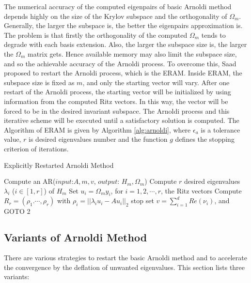{The numerical accuracy of the computed eigenpairs of basic Arnoldi method depends highly on the size of the Krylov subspace and the orthogonality of $\Omega_m$. Generally, the larger the subspace is, the better the eigenpairs approximation is. The problem is that firstly the orthogonality of the computed $\Omega_m$ tends to degrade with each basis extension. Also, the larger the subspace size is, the larger the $\Omega_m$ matrix gets. Hence available memory may also limit the subspace size, and so the achievable accuracy of the Arnoldi process. To overcome this, Saad \cite{saad2011numerical} proposed to restart the Arnoldi process, which is the ERAM. Inside ERAM, the subspace size is fixed as $m$, and only the starting vector will vary. After one restart of the Arnoldi process, the starting vector will be initialized by using information from the computed Ritz vectors. In this way, the vector will be forced to be in the desired invariant subspace. The Arnoldi process and this iterative scheme will be executed until a satisfactory solution is computed. The Algorithm of ERAM is given by Algorithm \ref{alg:arnoldi}, where $\epsilon_a$ is a tolerance value, $r$ is desired eigenvalues number and the function $g$ defines the stopping criterion of iterations.

\begin{algorithm}[htbp]{}
	\caption{Explicitly Restarted Arnoldi Method}   
	\label{alg:arnoldi}   
	\begin{algorithmic}[1]
		\State Compute an AR($input$:$A,m,v$, $output$: $H_m, \Omega_m$)
		\State Compute $r$ desired eigenvalues $\lambda_i$ ($i  \in [1,r] $) of $H_m$
		\State Set $u_i=\Omega_my_i$, for $i=1,2,\cdots, r$, the Ritz vectors    
		\State Compute $R_r=(\rho_1.\cdots, \rho_r)$ with $\rho_i=||\lambda_i u_i - A u_i||_2$
		\State stop
		\Else
		\State set $v=\sum_{i=1}^d Re(\nu_i)$, and GOTO 2
		\EndIf
		\EndFunction
	\end{algorithmic}  
\end{algorithm}

\subsection{Variants of Arnoldi Method}

There are various strategies to restart the basic Arnoldi method and to accelerate the convergence by the deflation of unwanted eigenvalues. This section lists three variants:

}
